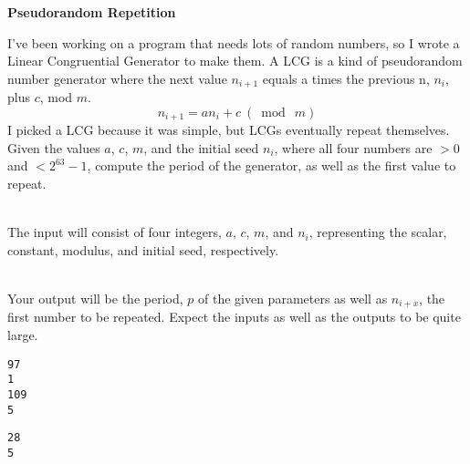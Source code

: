 \documentclass[12pt]{article}
\begin{document}
\begin{center}
   \Large\textbf{Pseudorandom Repetition}
\end{center}

I've been working on a program that needs lots of random numbers, so I wrote a Linear Congruential Generator to make them. A LCG is a kind of pseudorandom number generator where the next value \(n_{i+1}\) equals a times the previous n, \(n_i\), plus \(c\), mod \(m\).
\[n_{i+1} = a n_i + c~(\bmod~m)\]
I picked a LCG because it was simple, but LCGs eventually repeat themselves. Given the values \(a\), \(c\), \(m\), and the initial seed \(n_i\), where all four numbers are \(>0\) and \(<2^{63}-1\), compute the period of the generator, as well as the first value to repeat.

\vspace*{.3in} \\

The input will consist of four integers, \(a\), \(c\), \(m\), and \(n_i\), representing the scalar, constant, modulus, and initial seed, respectively.

\vspace*{.3in} \\

Your output will be the period, \(p\) of the given parameters as well as \(n_{i+x}\), the first number to be repeated. Expect the inputs as well as the outputs to be quite large.

\vspace*{.3in} 
\begin{verbatim}
97
1
109
5
\end{verbatim}

\vspace*{.3in} 
\begin{verbatim}
28
5
\end{verbatim}
\end{document}

